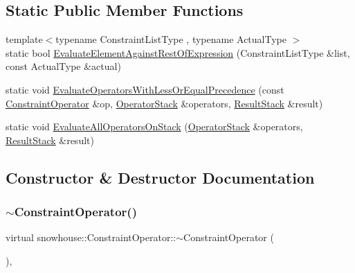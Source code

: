 \subsection*{Static Public Member Functions}
\begin{DoxyCompactItemize}
\item 
{\footnotesize template$<$typename Constraint\+List\+Type , typename Actual\+Type $>$ }\\static bool \mbox{\hyperlink{structsnowhouse_1_1ConstraintOperator_afbfbb1f5a56cd105ffbe8caceaaa7930}{Evaluate\+Element\+Against\+Rest\+Of\+Expression}} (Constraint\+List\+Type \&list, const Actual\+Type \&actual)
\item 
static void \mbox{\hyperlink{structsnowhouse_1_1ConstraintOperator_aafb0a6fce0186a0afc4854ffe69b6a23}{Evaluate\+Operators\+With\+Less\+Or\+Equal\+Precedence}} (const \mbox{\hyperlink{structsnowhouse_1_1ConstraintOperator}{Constraint\+Operator}} \&op, \mbox{\hyperlink{namespacesnowhouse_adcb10e215e6a4bbcb35722a9c7270fc6}{Operator\+Stack}} \&operators, \mbox{\hyperlink{namespacesnowhouse_a719169b1315a13161c15f25e600a8f51}{Result\+Stack}} \&result)
\item 
static void \mbox{\hyperlink{structsnowhouse_1_1ConstraintOperator_abccac090f8d0b6e400934dbb24e6d4e4}{Evaluate\+All\+Operators\+On\+Stack}} (\mbox{\hyperlink{namespacesnowhouse_adcb10e215e6a4bbcb35722a9c7270fc6}{Operator\+Stack}} \&operators, \mbox{\hyperlink{namespacesnowhouse_a719169b1315a13161c15f25e600a8f51}{Result\+Stack}} \&result)
\end{DoxyCompactItemize}


\subsection{Constructor \& Destructor Documentation}
\mbox{\label{structsnowhouse_1_1ConstraintOperator_ab34ad26e971feefdc35cd56d8f289633}} 
\subsubsection{\texorpdfstring{$\sim$ConstraintOperator()}{~ConstraintOperator()}}
{\footnotesize\ttfamily virtual snowhouse\+::\+Constraint\+Operator\+::$\sim$\+Constraint\+Operator (\begin{DoxyParamCaption}{ }\end{DoxyParamCaption})\hspace{0.3cm}{\ttfamily [inline]}, {\ttfamily [virtual]}}



